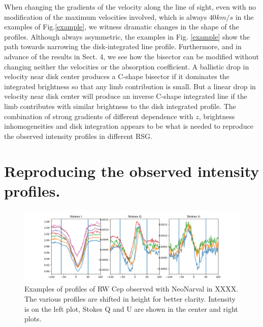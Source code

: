 \documentclass{/Users/art2/TeX/aanda/aa}
\def\kms {km\,s$^{-1}$}
\begin{document}
When changing the gradients of the velocity along the line of sight, even with no modification of the maximum velocities involved, which is 
always $40km/s$ in the examples of Fig.\ref{example}, we witness dramatic changes in the shape of the profiles. Although always asymmetric, the 
examples 
in Fig. \ref{example} show the path towards narrowing the disk-integrated line profile. Furthermore, and in advance of the results in Sect. 4, we see how the bisector can be modified without 
changing neither the velocities or the absorption 
coefficient. A ballistic drop in velocity near disk center produces a C-shape bisector if it dominates the integrated brightness so that any limb 
contribution is 
small. But a linear drop in velocity near disk center will produce an inverse C-shape integrated line if the limb contributes with similar brightness 
to the 
disk integrated profile. The combination of strong gradients of different dependence with $z$, brightness inhomogeneities and disk integration 
appears to be what is needed to reproduce the observed intensity profiles in different RSG.

\section{Reproducing the observed intensity profiles.}

\begin{figure}
   \includegraphics[width=\textwidth]{RWCep.png}
   \caption{ Examples of profiles of RW Cep observed with NeoNarval in XXXX. The various profiles 
   are shifted in height for better clarity. Intensity is on the left plot, Stokes Q and U are shown 
   in the center and right plots.}
   \label{observed}
   \end{figure}
\end{document}

